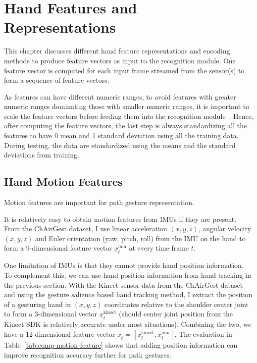 \chapter{Hand Features and Representations}
This chapter discusses different 
hand feature representations and encoding methods to produce feature
vectors as input to the recognition module.  One feature vector is computed
for each input frame streamed from the sensor(s) to form a sequence of feature
vectors.

As features can have different numeric ranges, to avoid features with greater
numeric ranges dominating those with smaller numeric ranges, it is important to
scale the feature vectors before feeding them  into the recognition
module~\cite{hsu10}. Hence, after computing the feature vectors, the last step
is always standardizing all the features to have 0 mean and 1 standard deviation
using all the training data. During testing, the data are standardized using the means and the standard deviations from training.

\section{Hand Motion Features}
Motion features are important for path gesture representation. 

It is relatively easy to obtain motion features from IMUs if they are present.
From the ChAirGest dataset, I use linear acceleration $(x, y, z)$,
angular velocity $(x, y, z)$ and Euler orientation (yaw, pitch, roll) from the
IMU on the hand to form a 9-dimensional feature vector
$\underline{x}_t^{\text{imu}}$ at every time frame $t$.

One limitation of IMUs is that they cannot provide hand position information. To
complement this, we can use hand position information from hand tracking in the
previous section. With the Kinect sensor data from the ChAirGest dataset and
using the gesture salience based hand tracking method, I extract the position of a gesturing hand in $(x, y, z)$ coordinates relative to the shoulder center joint to form a 3-dimensional vector $\underline{x}^\text{kinect}_t$ (should center joint position from the Kinect
SDK is relatively accurate under most situations).
Combining the two, we
have a 12-dimensional feature vector $\underline{x}_t =
[\underline{x}^\text{kinect}_t, \underline{x}^\text{imu}_t]$.
The evaluation in Table~\ref{tab:comp-motion-feature} shows that adding
position information can improve recognition accuracy further for path gestures. 

